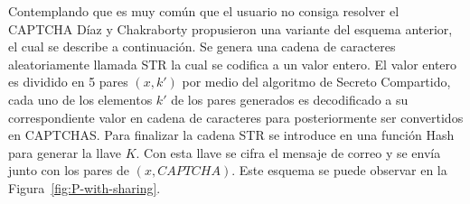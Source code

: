  
 Contemplando que es muy común que el usuario no consiga resolver el CAPTCHA D\'iaz y Chakraborty propusieron una variante del esquema anterior, el cual se describe a continuaci\'on. 
 Se genera una cadena de caracteres aleatoriamente llamada STR la cual se codifica a un valor entero. El valor entero es dividido en 5 pares $(x,k')$ por medio del algoritmo de Secreto Compartido, cada uno de los elementos $k'$ de los pares generados es decodificado a su correspondiente valor en cadena de caracteres para posteriormente ser convertidos en CAPTCHAS. Para finalizar la cadena STR se introduce en una función Hash para generar la llave $K$. Con esta llave se cifra el mensaje de correo y se envía junto con los pares de $(x,CAPTCHA)$.
Este esquema se puede observar en la Figura~\ref{fig:P-with-sharing}.
